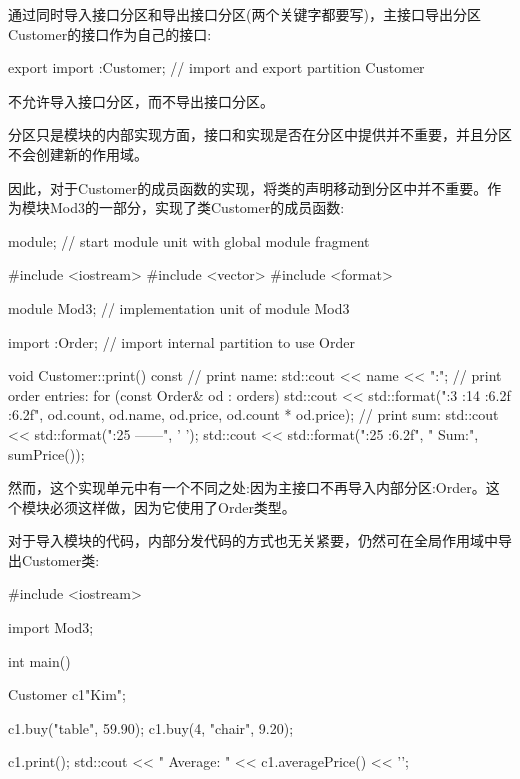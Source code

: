 通过同时导入接口分区和导出接口分区(两个关键字都要写)，主接口导出分区Customer的接口作为自己的接口:

\begin{cpp}
export import :Customer; // import and export partition Customer
\end{cpp}

不允许导入接口分区，而不导出接口分区。

分区只是模块的内部实现方面，接口和实现是否在分区中提供并不重要，并且分区不会创建新的作用域。

因此，对于Customer的成员函数的实现，将类的声明移动到分区中并不重要。作为模块Mod3的一部分，实现了类Customer的成员函数:


\begin{cpp}
module; // start module unit with global module fragment

#include <iostream>
#include <vector>
#include <format>

module Mod3; // implementation unit of module Mod3

import :Order; // import internal partition to use Order

void Customer::print() const
{
	// print name:
	std::cout << name << ":\n";
	// print order entries:
	for (const Order& od : orders) {
		std::cout << std::format("{:3} {:14} {:6.2f} {:6.2f}\n",
								   od.count, od.name, od.price, od.count * od.price);
	}
	// print sum:
	std::cout << std::format("{:25} ------\n", ' ');
	std::cout << std::format("{:25} {:6.2f}\n", " Sum:", sumPrice());
}
\end{cpp}

然而，这个实现单元中有一个不同之处:因为主接口不再导入内部分区:Order。这个模块必须这样做，因为它使用了Order类型。

对于导入模块的代码，内部分发代码的方式也无关紧要，仍然可在全局作用域中导出Customer类:


\begin{cpp}
#include <iostream>

import Mod3;

int main()
{
	Customer c1{"Kim"};
	
	c1.buy("table", 59.90);
	c1.buy(4, "chair", 9.20);
	
	c1.print();
	std::cout << " Average: " << c1.averagePrice() << '\n';
}
\end{cpp}



